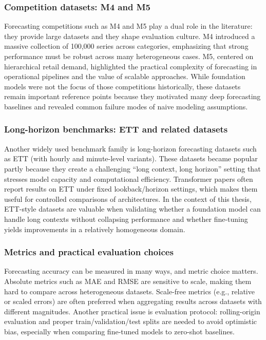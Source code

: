 \subsubsection{Competition datasets: M4 and M5}
Forecasting competitions such as M4 and M5 play a dual role in the literature: they provide large datasets and they shape evaluation culture. M4 introduced a massive collection of 100{,}000 series across categories, emphasizing that strong performance must be robust across many heterogeneous cases. M5, centered on hierarchical retail demand, highlighted the practical complexity of forecasting in operational pipelines and the value of scalable approaches. While foundation models were not the focus of those competitions historically, these datasets remain important reference points because they motivated many deep forecasting baselines and revealed common failure modes of naive modeling assumptions.

\subsubsection{Long-horizon benchmarks: ETT and related datasets}
Another widely used benchmark family is long-horizon forecasting datasets such as ETT (with hourly and minute-level variants). These datasets became popular partly because they create a challenging ``long context, long horizon'' setting that stresses model capacity and computational efficiency. Transformer papers often report results on ETT under fixed lookback/horizon settings, which makes them useful for controlled comparisons of architectures. In the context of this thesis, ETT-style datasets are valuable when validating whether a foundation model can handle long contexts without collapsing performance and whether fine-tuning yields improvements in a relatively homogeneous domain.

\subsubsection{Metrics and practical evaluation choices}
Forecasting accuracy can be measured in many ways, and metric choice matters. Absolute metrics such as MAE and RMSE are sensitive to scale, making them hard to compare across heterogeneous datasets. Scale-free metrics (e.g., relative or scaled errors) are often preferred when aggregating results across datasets with different magnitudes. Another practical issue is evaluation protocol: rolling-origin evaluation and proper train/validation/test splits are needed to avoid optimistic bias, especially when comparing fine-tuned models to zero-shot baselines.

